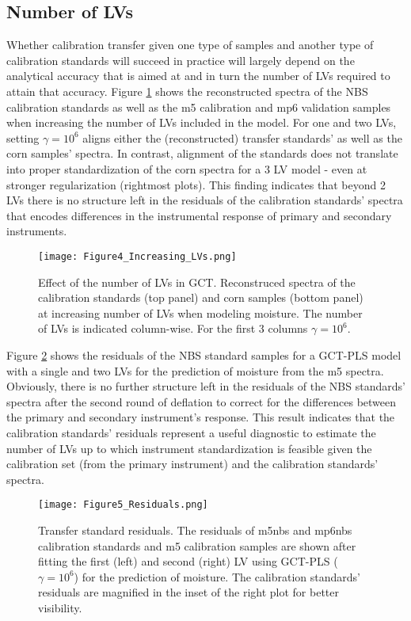 \documentclass{article}
\begin{document}
\subsection{Number of LVs}
Whether calibration transfer given one type of samples and another type of calibration standards will succeed in practice will largely depend on the analytical accuracy that is aimed at and in turn the number of LVs required to attain that accuracy. Figure \ref{fig:figure5} shows the reconstructed spectra of the NBS calibration standards as well as the m5 calibration and mp6 validation samples when increasing the number of LVs included in the model. For one and two LVs, setting $\gamma = 10^6$ aligns either the (reconstructed) transfer standards' as well as the corn samples' spectra. In contrast, alignment of the standards does not translate into proper standardization of the corn spectra for a 3 LV model - even at stronger regularization (rightmost plots). This finding indicates that beyond 2 LVs there is no structure left in the residuals of the calibration standards' spectra that encodes differences in the instrumental response of primary and secondary instruments. 
\begin{figure}[]
	\centering
	\texttt{[image: Figure4\_Increasing\_LVs.png]}
	\caption{Effect of the number of LVs in GCT. Reconstruced spectra of the calibration standards (top panel) and corn samples (bottom panel) at increasing number of LVs when modeling moisture. The number of LVs is indicated column-wise. For the first 3 columns $\gamma=10^6$.}
	\label{fig:figure5}
\end{figure}
Figure \ref{fig:figure6} shows the residuals of the NBS standard samples for a GCT-PLS model with a single and two LVs for the prediction of moisture from the m5 spectra. Obviously, there is no further structure left in the residuals of the NBS standards' spectra after the second round of deflation to correct for the differences between the primary and secondary instrument's response. This result indicates that the calibration standards' residuals represent a useful diagnostic to estimate the number of LVs up to which instrument standardization is feasible given the calibration set (from the primary instrument) and the calibration standards' spectra.

\begin{figure}[]
	\centering
	\texttt{[image: Figure5\_Residuals.png]}
	\caption{Transfer standard residuals. The residuals of m5nbs and mp6nbs calibration standards and m5 calibration samples are shown after fitting the first (left) and second (right) LV using GCT-PLS ($\gamma = 10^6$) for the prediction of moisture. The calibration standards' residuals are magnified in the inset of the right plot for better visibility.}
	\label{fig:figure6}
\end{figure}
\end{document}
